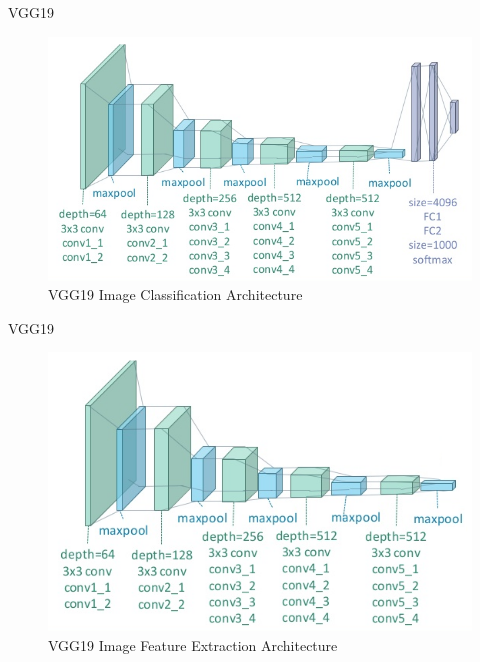 \documentclass{beamer}
\begin{document}
\begin{frame}{VGG19}
\begin{figure}[H]
\centering
\includegraphics[width=\textwidth]{img/vgg19/classification}
\caption*{VGG19 Image Classification Architecture}
\end{figure}
\end{frame}



\begin{frame}{VGG19}
\begin{figure}[H]
\centering
\includegraphics[width=.9\textwidth]{img/vgg19/feature-extraction}
\caption*{VGG19 Image Feature Extraction Architecture}
\end{figure}
\end{frame}
\end{document}
